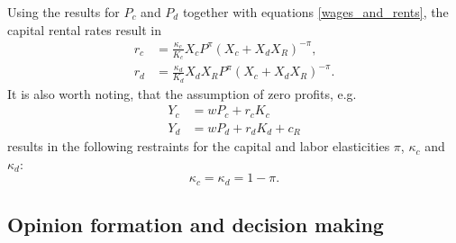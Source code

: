 Using the results for $P_c$ and $P_d$ together with equations \eqref{wages_and_rents}, the capital rental rates result in
\begin{align}
	r_c &= \frac{\kappa_c}{K_c}X_c P^{\pi}\left( X_c + X_d X_R \right)^{-\pi}, \label{r_c_result}\\
	r_d &= \frac{\kappa_d}{K_d}X_d X_R P^{\pi}\left( X_c + X_d X_R \right)^{-\pi}. \label{r_d_result}
\end{align}
It is also worth noting, that the assumption of zero profits, e.g.
\begin{align}
	Y_c &= w P_c + r_c K_c \nonumber \\
	Y_d &= w P_d + r_d K_d + c_R \nonumber
\end{align}
results in the following restraints for the capital and labor elasticities $\pi$, $\kappa_c$ and $\kappa_d$:
\begin{equation}
	\kappa_c = \kappa_d = 1-\pi.
	\label{elasticities_restriction}
\end{equation}

\subsection{Opinion formation and decision making}


